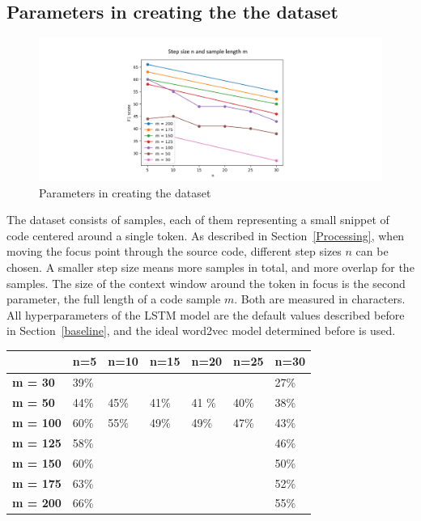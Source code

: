 \documentclass[
a4paper,
pagesize,
pdftex,
12pt,
twoside, %
BCOR=5mm, %
ngerman,
fleqn,
final,
]{scrartcl}
\begin{document}
	
	\subsection{Parameters in creating the the dataset}
	
	\begin{figure}[H]
		\centering
		\includegraphics[width=1\textwidth]{img/parametersmn}
		\caption{Parameters in creating the dataset}
		\label{fig:mn}
	\end{figure}
	The dataset consists of samples, each of them representing a small snippet of code centered around a single token. As described in Section~\ref{Processing}, when moving the focus point through the source code, different step sizes $n$ can be chosen. A smaller step size means more samples in total, and more overlap for the samples. The size of the context window around the token in focus is the second parameter, the full length of a code sample $m$. Both are measured in characters. All  hyperparameters of the LSTM model are the default values described before in Section~\ref{baseline}, and the ideal word2vec model determined before is used.
	
	\begin{tabular}{|p{2cm}||p{1.7cm}|p{1.7cm}|p{1.7cm}|p{1.7cm}|p{1.7cm}|p{1.7cm}|}
		\hline
		& \textbf{n=5} &\textbf{n=10} & \textbf{n=15} & \textbf{n=20} & \textbf{n=25} & \textbf{n=30} \\
		\hline
		\textbf{m = 30} & 39\% &  &  & &  & 27\% \\ 
		\textbf{m = 50} & 44\% & 45\% &41\% &41 \%& 40\% & 38\% \\ 
		\textbf{m = 100} & 60\% & 55\% &49\% &49\%&  47\% &43\% \\
		\textbf{m = 125} & 58\% &  &  & &  & 46\% \\
		\textbf{m = 150} & 60\% &  &  & &  & 50\% \\
		\textbf{m = 175} & 63\% &  &  & &  & 52\% \\
		\textbf{m = 200} & 66\% &  &  & &  & 55\% \\
		\hline
		\hline
	\end{tabular}
	
\end{document}
